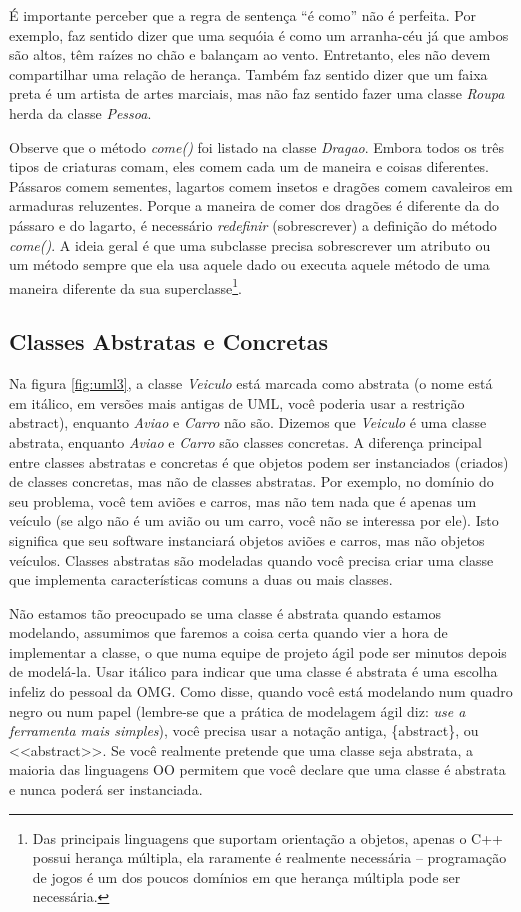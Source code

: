 \documentclass[
	11pt,				%
	openright,
	twoside,			%
	a4paper,			%
	english,			%
	french,
	brazil,				%
	sumario=tradicional
	]{abntex2}
\begin{document}
É importante perceber que a regra de sentença ``é como'' não é perfeita. Por exemplo, faz sentido dizer que uma sequóia é como um arranha-céu já que ambos são altos, têm raízes no chão e balançam ao vento. Entretanto, eles não devem compartilhar uma relação de herança. Também faz sentido dizer que um faixa preta é um artista de artes marciais, mas não faz sentido fazer uma classe \emph{Roupa} herda da classe \emph{Pessoa}.

Observe que o método \emph{come()} foi listado na classe \emph{Dragao}. Embora todos os três tipos de criaturas comam, eles comem cada um de maneira e coisas diferentes. Pássaros comem sementes, lagartos comem insetos e dragões comem cavaleiros em armaduras reluzentes. Porque a maneira de comer dos dragões é diferente da do pássaro e do lagarto, é necessário \textit{redefinir} (sobrescrever) a definição do método \emph{come()}. A ideia geral é que uma subclasse precisa sobrescrever um atributo ou um método sempre que ela usa aquele dado ou executa aquele método de uma maneira diferente da sua superclasse\footnote{Das principais linguagens que suportam orientação a objetos, apenas o C++ possui herança múltipla, ela raramente é realmente necessária -- programação de jogos é um dos poucos domínios em que herança múltipla pode ser necessária.}.

\subsection{Classes Abstratas e Concretas}

Na figura \ref{fig:uml3}, a classe \emph{Veiculo} está marcada como abstrata (o nome está em itálico, em versões mais antigas de UML, você poderia usar a restrição {abstract}), enquanto \emph{Aviao} e \emph{Carro} não são. Dizemos que 
\emph{Veiculo} é uma classe abstrata, enquanto \emph{Aviao} e \emph{Carro} são classes concretas. A diferença principal entre classes abstratas e concretas é que objetos podem ser instanciados (criados) de classes concretas, mas não de classes abstratas. Por exemplo, no domínio do seu problema, você tem aviões e carros, mas não tem nada que é apenas um veículo (se algo não é um avião ou um carro, você não se interessa por ele). Isto significa que seu software instanciará objetos aviões e carros, mas não objetos veículos. Classes abstratas são modeladas quando você precisa criar uma classe que implementa características comuns a duas ou mais classes.

Não estamos tão preocupado se uma classe é abstrata quando estamos modelando, assumimos que faremos a coisa certa quando vier a hora de implementar a classe, o que numa equipe de projeto ágil pode ser minutos depois de modelá-la. Usar itálico para indicar que uma classe é abstrata é uma escolha infeliz do pessoal da OMG. Como  disse, quando você está modelando num quadro negro ou num papel (lembre-se que a prática de modelagem ágil diz: \textit{use a ferramenta mais simples}), você precisa usar a notação antiga, \{abstract\}, ou <<abstract>>. Se você realmente pretende que uma classe seja abstrata, a maioria das linguagens OO permitem que você declare que uma classe é abstrata e nunca poderá ser instanciada.
\end{document}
